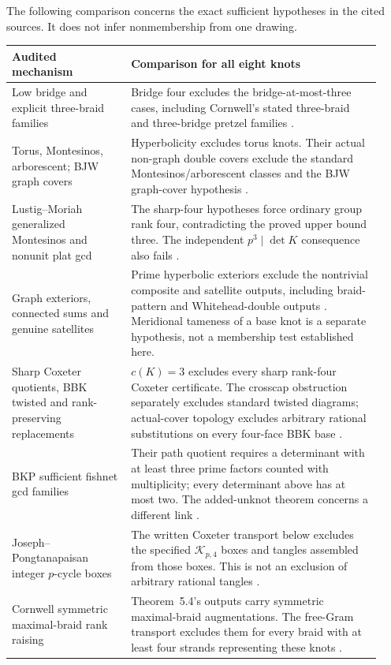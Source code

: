 \documentclass[11pt]{article}
\begin{document}
The following comparison concerns the exact sufficient hypotheses in
the cited sources. It does not infer nonmembership from one drawing.
\begin{longtable}{p{0.30\linewidth}p{0.63\linewidth}}
\hline
Audited mechanism & Comparison for all eight knots\\
\hline
Low bridge and explicit three-braid families
& Bridge four excludes the bridge-at-most-three cases, including
Cornwell's stated three-braid and three-bridge pretzel families
\cite{bjw,cornwell,cornwell17}.\\[3pt]
Torus, Montesinos, arborescent; BJW graph covers
& Hyperbolicity excludes torus knots. Their actual non-graph double
covers exclude the standard Montesinos/arborescent classes and the
BJW graph-cover hypothesis \cite{rz,musick,bjw}.\\[3pt]
Lustig--Moriah generalized Montesinos and nonunit plat gcd
& The sharp-four hypotheses force ordinary group rank four,
contradicting the proved upper bound three. The independent
$p^3\mid\det K$ consequence also fails \cite{moriah}.\\[3pt]
Graph exteriors, connected sums and genuine satellites
& Prime hyperbolic exteriors exclude the nontrivial composite and
satellite outputs, including braid-pattern and Whitehead-double
outputs \cite{bdjw,ch,whitehead}. Meridional tameness of a base knot
is a separate hypothesis, not a membership test established here.\\[3pt]
Sharp Coxeter quotients, BBK twisted and rank-preserving replacements
& $c(K)=3$ excludes every sharp rank-four Coxeter certificate.
The crosscap obstruction separately excludes standard twisted
diagrams; actual-cover topology excludes arbitrary rational
substitutions on every four-face BBK base \cite{bbk,bkm}.\\[3pt]
BKP sufficient fishnet gcd families
& Their path quotient requires a determinant with at least three
prime factors counted with multiplicity; every determinant above
has at most two. The added-unknot theorem concerns a different link
\cite{fishnet}.\\[3pt]
Joseph--Pongtanapaisan integer $p$-cycle boxes
& The written Coxeter transport below excludes the specified
$\mathcal K_{p,4}$ boxes and tangles assembled from those boxes.
This is not an exclusion of arbitrary rational tangles \cite{jp}.\\[3pt]
Cornwell symmetric maximal-braid rank raising
& Theorem~5.4's outputs carry symmetric maximal-braid augmentations.
The free-Gram transport excludes them for every braid with at least
four strands representing these knots \cite{cornwell17}.\\
\hline
\end{longtable}
\end{document}
